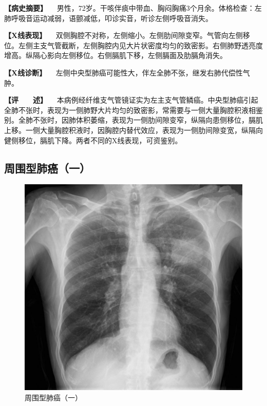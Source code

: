 \textbf{【病史摘要】}
　男性，72岁。干咳伴痰中带血、胸闷胸痛3个月余。体格检查：左肺呼吸音运动减弱，语颤减低，叩诊实音，听诊左侧呼吸音消失。

\textbf{【X线表现】}
　双侧胸腔不对称，左侧缩小。左侧肋间隙变窄。气管向左侧移位。左侧主支气管截断，左侧胸腔内见大片状密度均匀的致密影。右侧肺野透亮度增高。纵隔心影向左侧移位。右侧膈肌下移，左侧膈面及肋膈角消失。

\textbf{【X线诊断】}
　左侧中央型肺癌可能性大，伴左全肺不张，继发右肺代偿性气肿。

\textbf{【评　　述】}
　本病例经纤维支气管镜证实为左主支气管鳞癌。中央型肺癌引起全肺不张时，表现为一侧肺野大片均匀的致密影，常需要与一侧大量胸腔积液相鉴别。全肺不张时，因肺体积萎缩，表现为一侧肋间隙变窄，纵隔向患侧移位，膈肌上移。一侧大量胸腔积液时，因胸腔内替代效应，表现为一侧肋间隙变宽，纵隔向健侧移位，膈肌下降。两者不同的X线表现，可资鉴别。

\subsection{周围型肺癌（一）}

\begin{figure}[!htbp]
 \centering
 \includegraphics{./images/Image00166.jpg}
 \captionsetup{justification=centering}
 \caption{周围型肺癌（一）}
 \label{fig3-8-4}
  \end{figure} 

